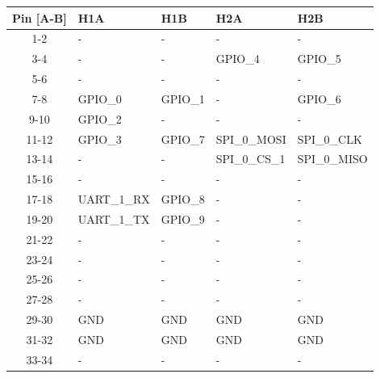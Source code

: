 \begin{table}[!h]
    \centering
    \begin{tabular}{cllll}
        \toprule[1.5pt]
        \textbf{Pin [A-B]} & \textbf{H1A}     & \textbf{H1B}     & \textbf{H2A}  & \textbf{H2B}  \\
        \midrule
        1-2                & -                & -                & -             & -             \\
        3-4                & -                & -                & GPIO\_4       & GPIO\_5       \\
        5-6                & -                & -                & -             & -             \\
        7-8                & GPIO\_0          & GPIO\_1          & -             & GPIO\_6       \\
        9-10               & GPIO\_2          & -                & -             & -             \\
        11-12              & GPIO\_3          & GPIO\_7          & SPI\_0\_MOSI  & SPI\_0\_CLK   \\
        13-14              & -                & -                & SPI\_0\_CS\_1 & SPI\_0\_MISO  \\
        15-16              & -                & -                & -             & -             \\
        17-18              & UART\_1\_RX      & GPIO\_8          & -             & -             \\
        19-20              & UART\_1\_TX      & GPIO\_9          & -             & -             \\
        21-22              & -                & -                & -             & -             \\
        23-24              & -                & -                & -             & -             \\
        25-26              & -                & -                & -             & -             \\
        27-28              & -                & -                & -             & -             \\
        29-30              & GND              & GND              & GND           & GND           \\
        31-32              & GND              & GND              & GND           & GND           \\
        33-34              & -                & -                & -             & -             \\

\end{tabular}
\end{table}
